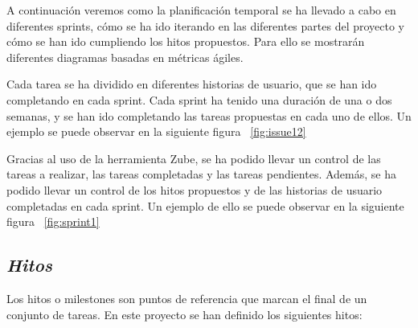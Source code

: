  A continuación veremos como la planificación temporal se ha llevado a cabo en diferentes sprints, cómo se ha ido iterando en las diferentes partes del proyecto y cómo se han ido cumpliendo los hitos propuestos. Para ello se mostrarán diferentes diagramas basadas en métricas ágiles.

 Cada tarea se ha dividido en diferentes historias de usuario, que se han ido completando en cada sprint. Cada sprint ha tenido una duración de una o dos semanas, y se han ido completando las tareas propuestas en cada uno de ellos.
 Un ejemplo se puede observar en la siguiente figura ~\ref{fig:issue12}

Gracias al uso de la herramienta Zube, se ha podido llevar un control de las tareas a realizar, las tareas completadas y las tareas pendientes. Además, se ha podido llevar un control de los hitos propuestos y de las historias de usuario completadas en cada sprint. Un ejemplo de ello se puede observar en la siguiente figura ~\ref{fig:sprint1}

\subsection{\textit{Hitos}}
Los hitos o milestones son puntos de referencia que marcan el final de un conjunto de tareas. En este proyecto se han definido los siguientes hitos:

